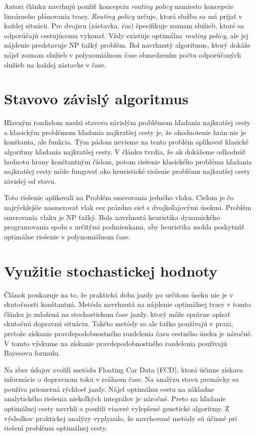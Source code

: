 Autori článku \cite{routing} navrhujú použiť koncepciu \textit{routing policy} namiesto koncepcie lineárneho plánovania trasy.\textit{ Routing policy} určuje, ktorá služba sa má prijať v každej situácii. Pre dvojicu (zástavka, čas) špecifikuje zoznam služieb, ktoré sa odporúčajú cestujúcemu vykonať. Vždy existuje optimálna \textit{routing policy}, ale jej nájdenie predstavuje NP ťažký problém. Bol navrhnutý algoritmus, ktorý dokáže nájsť zoznam služieb v polynomiálnom čase obmedzením počtu odporúčaných služieb na každej zástavke v čase.

\section{Stavovo závislý algoritmus}
Hlavným rozdielom medzi stavovo závislým problémom hľadania najkratšej cesty a klasickým problémom hľadania najkratšej cesty je, že ohodnotenie hrán nie je konštanta, ale funkcia. Tým pádom nevieme na tento problém aplikovať klasické algoritmy hľadania najkratšej cesty. V článku \cite{trains} tvrdia, že ak dokážeme odhadnúť hodnotu hrany konštantným číslom, potom riešenie klasického problému hľadania najkratšej cesty môže fungovať ako heuristické riešenie problému najkratšej cesty závislej od stavu.

Toto riešenie aplikovali na Problém smerovania jedného vlaku. Cieľom je čo najrýchlejšie nasmerovať vlak cez prázdnu sieť s dvojkoľajovými úsekmi. Problém smerovania vlaku je NP ťažký. Bola navrhnutá heuristika dynamického programovania spolu s určitými podmienkami, aby heuristika mohla poskytnúť optimálne riešenie v polynomiálnom čase.

\section{Využitie stochastickej hodnoty}
Článok \cite{stochastic} poukazuje na to, že praktická doba jazdy po určitom úseku nie je v skutočnosti konštantná. Metóda navrhnutá na nájdenie optimálnej trasy v tomto článku je založená na stochastickom čase jazdy, ktorý môže správne opísať skutočnú dopravnú situáciu. Takéto metódy sa ale ťažko používajú v praxi, pretože získanie pravdepodobnostného rozdelenia času cestného úseku je náročné. V tomto výskume na získanie pravdepodobnostného rozdelenia používajú Bayesovu formulu.

Na zber údajov zvolili metódu Floating Car Data (FCD), ktorá účinne získava informácie o dopravnom toku v reálnom čase. 
Na analýzu stavu premávky sa používa priemerná rýchlosť jazdy. Nájsť optimálnu cestu na základne analytického riešenia niekoľkých integrálov je náročné. Preto na hľadanie optimálnej cesty navrhli a použili viaceré vylepšené genetické algoritmy. 
Z výsledkov praktickej analýzy vyplynulo, že navrhované metódy sú účinné pri riešení problému optimálnej cesty.

